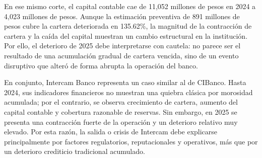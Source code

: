 En ese mismo corte, el capital contable cae de 11,052 millones de pesos en 2024 a 4,023 millones de pesos. Aunque la estimación preventiva de 891 millones de pesos cubre la cartera deteriorada en 135.62\%, la magnitud de la contracción de cartera y la caída del capital muestran un cambio estructural en la institución. Por ello, el deterioro de 2025 debe interpretarse con cautela: no parece ser el resultado de una acumulación gradual de cartera vencida, sino de un evento disruptivo que alteró de forma abrupta la operación del banco.

En conjunto, Intercam Banco representa un caso similar al de CIBanco. Hasta 2024, sus indicadores financieros no muestran una quiebra clásica por morosidad acumulada; por el contrario, se observa crecimiento de cartera, aumento del capital contable y cobertura razonable de reservas. Sin embargo, en 2025 se presenta una contracción fuerte de la operación y un deterioro relativo muy elevado. Por esta razón, la salida o crisis de Intercam debe explicarse principalmente por factores regulatorios, reputacionales y operativos, más que por un deterioro crediticio tradicional acumulado.